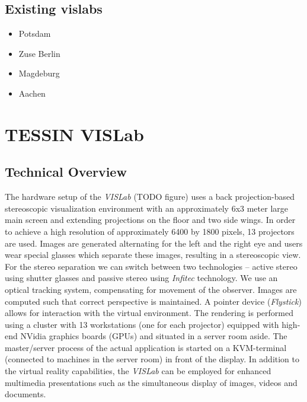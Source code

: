 \subsection{Existing vislabs}
\label{existing-vislabs}

\begin{itemize}
\itemsep1pt\parskip0pt
\item
  Potsdam
\item
  Zuse Berlin
\item
  Magdeburg
\item
  Aachen
\end{itemize}

\section{TESSIN VISLab}
\label{tessin-vislab}

\subsection{Technical Overview}
\label{technical-overview}

The hardware setup of the \emph{VISLab} (TODO figure) uses a back projection-based stereoscopic visualization environment with an approximately 6x3 meter large main screen and extending projections on the floor and two side wings. In order to achieve a high resolution of approximately 6400 by 1800 pixels, 13 projectors are used. Images are generated alternating for the left and the right eye and users wear special glasses which separate these images, resulting in a stereoscopic view. For the stereo separation we can switch between two technologies -- active stereo using shutter glasses and passive stereo using \emph{Infitec} \cite{infitec} technology. We use an optical tracking system, compensating for movement of the observer. Images are computed such that correct perspective is maintained. A pointer device (\emph{Flystick}) allows for interaction with the virtual environment. The rendering is performed using a cluster with 13 workstations (one for each projector) equipped with high-end NVidia graphics boards (GPUs) and situated in a server room aside. The master/server process of the actual application is started on a KVM-terminal (connected to machines in the server room) in front of the display. In addition to the virtual reality capabilities, the \emph{VISLab} can be employed for enhanced multimedia presentations such as the simultaneous display of images, videos and documents.

